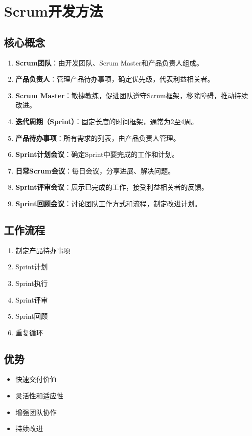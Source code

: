 \documentclass[12pt]{article}
\begin{document}
	\section{Scrum开发方法}
	
	\subsection{核心概念}
	\begin{enumerate}
		\item \textbf{Scrum团队}：由开发团队、Scrum Master和产品负责人组成。
		\item \textbf{产品负责人}：管理产品待办事项，确定优先级，代表利益相关者。
		\item \textbf{Scrum Master}：敏捷教练，促进团队遵守Scrum框架，移除障碍，推动持续改进。
		\item \textbf{迭代周期（Sprint）}：固定长度的时间框架，通常为2至4周。
		\item \textbf{产品待办事项}：所有需求的列表，由产品负责人管理。
		\item \textbf{Sprint计划会议}：确定Sprint中要完成的工作和计划。
		\item \textbf{日常Scrum会议}：每日会议，分享进展、解决问题。
		\item \textbf{Sprint评审会议}：展示已完成的工作，接受利益相关者的反馈。
		\item \textbf{Sprint回顾会议}：讨论团队工作方式和流程，制定改进计划。
	\end{enumerate}
	
	\subsection{工作流程}
	\begin{enumerate}
		\item 制定产品待办事项
		\item Sprint计划
		\item Sprint执行
		\item Sprint评审
		\item Sprint回顾
		\item 重复循环
	\end{enumerate}
	
	\subsection{优势}
	\begin{itemize}
		\item 快速交付价值
		\item 灵活性和适应性
		\item 增强团队协作
		\item 持续改进
	\end{itemize}
	
\end{document}
